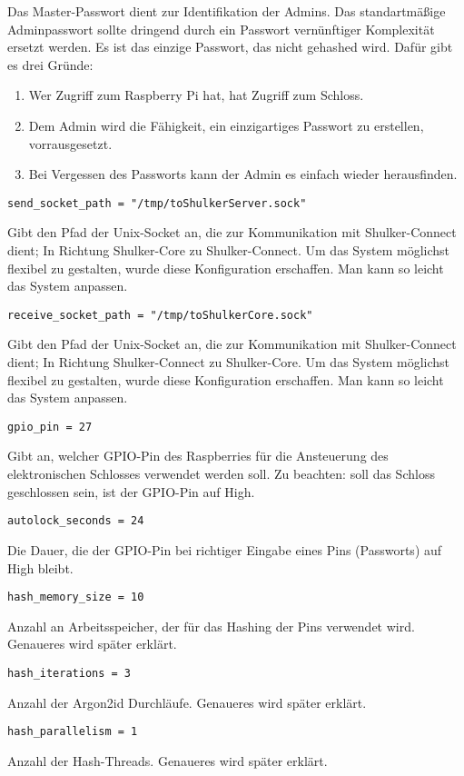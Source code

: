 Das Master-Passwort dient zur Identifikation der Admins. Das standartmäßige Adminpasswort sollte dringend durch 
ein Passwort vernünftiger Komplexität ersetzt werden. Es ist das einzige Passwort, das nicht gehashed wird. Dafür
gibt es drei Gründe: 
\begin{enumerate}
    \item Wer Zugriff zum Raspberry Pi hat, hat Zugriff zum Schloss.
    \item Dem Admin wird die Fähigkeit, ein einzigartiges Passwort zu erstellen, vorrausgesetzt.
    \item Bei Vergessen des Passworts kann der Admin es einfach wieder herausfinden. 
\end{enumerate}

\lstinline{send_socket_path = "/tmp/toShulkerServer.sock"}

Gibt den Pfad der Unix-Socket an, die zur Kommunikation mit Shulker-Connect dient; In Richtung Shulker-Core zu Shulker-Connect.
Um das System möglichst flexibel zu gestalten, wurde diese Konfiguration erschaffen. Man kann so leicht das System anpassen.

\lstinline{receive_socket_path = "/tmp/toShulkerCore.sock"}

Gibt den Pfad der Unix-Socket an, die zur Kommunikation mit Shulker-Connect dient; In Richtung Shulker-Connect zu Shulker-Core.
Um das System möglichst flexibel zu gestalten, wurde diese Konfiguration erschaffen. Man kann so leicht das System anpassen.

\lstinline{gpio_pin = 27}

Gibt an, welcher GPIO-Pin des Raspberries für die Ansteuerung des elektronischen Schlosses verwendet werden soll. Zu beachten:
soll das Schloss geschlossen sein, ist der GPIO-Pin auf High.

\lstinline{autolock_seconds = 24}

Die Dauer, die der GPIO-Pin bei richtiger Eingabe eines Pins (Passworts) auf High bleibt.

\lstinline{hash_memory_size = 10}

Anzahl an Arbeitsspeicher, der für das Hashing der Pins verwendet wird. Genaueres wird später erklärt.

\lstinline{hash_iterations = 3}

Anzahl der Argon2id Durchläufe. Genaueres wird später erklärt.

\lstinline{hash_parallelism = 1}

Anzahl der Hash-Threads. Genaueres wird später erklärt.


